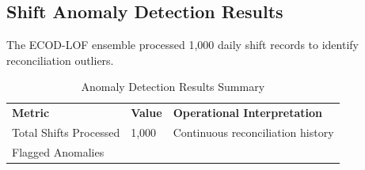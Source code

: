 \documentclass[12pt,a4paper,oneside]{report}
\begin{document}
\subsection{Shift Anomaly Detection
Results}\label{shift-anomaly-detection-results}

The ECOD-LOF ensemble processed 1,000 daily shift records to identify
reconciliation outliers.

\begin{longtable}[]{@{}
  >{\raggedright\arraybackslash}p{}
  >{\raggedright\arraybackslash}p{}
  >{\raggedright\arraybackslash}p{}@{}}
\caption{Anomaly Detection Results Summary\label{tab:table21}}\\

\toprule\noalign{}
\begin{minipage}[b]{\linewidth}\raggedright

\textbf{Metric}

\end{minipage} & \begin{minipage}[b]{\linewidth}\raggedright

\textbf{Value}

\end{minipage} & \begin{minipage}[b]{\linewidth}\centering

\textbf{Operational Interpretation}

\end{minipage} \\
\begin{minipage}[b]{\linewidth}\raggedright

Total Shifts Processed

\end{minipage} & \begin{minipage}[b]{\linewidth}\raggedright

1,000

\end{minipage} & \begin{minipage}[b]{\linewidth}\centering

Continuous reconciliation history

\end{minipage} \\
\begin{minipage}[b]{\linewidth}\raggedright

Flagged Anomalies


\end{minipage}
\end{longtable}
\end{document}
